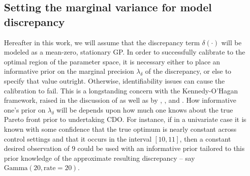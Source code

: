 \documentclass{article}
\begin{document}
\subsection{Setting the marginal variance for model discrepancy}\label{mvfmd}

Hereafter in this work, we will assume that 
the discrepancy term $\delta(\cdot)$ will be modeled as a mean-zero, stationary GP. 
%
In order to successfully calibrate to the optimal region of the parameter space, it is necessary either to place an informative prior on the marginal precision $\lambda_\delta$ of the discrepancy, or else to specify that value outright. 
%
Otherwise, identifiability issues can cause the calibration to fail.
%
This is a longstanding concern with the Kennedy-O'Hagan framework, raised in the discussion of \cite{Kennedy2001} as well as by \cite{Bayarri2007}, \cite{Tuo2015}, and \cite{Plumlee2017}.
%
How informative one's prior on $\lambda_\delta$ will be depends upon how much one knows about the true Pareto front prior to undertaking CDO.
%
For instance, if in a univariate case it is known with some confidence that the true optimum is nearly constant across control settings and that it occurs in the interval $[10,11]$, then a constant desired observation of $9$ could be used with an informative prior tailored to this prior knowledge of the approximate resulting discrepancy -- say $\mathrm{Gamma}(20,\mathrm{rate}=20)$.
%
\end{document}
